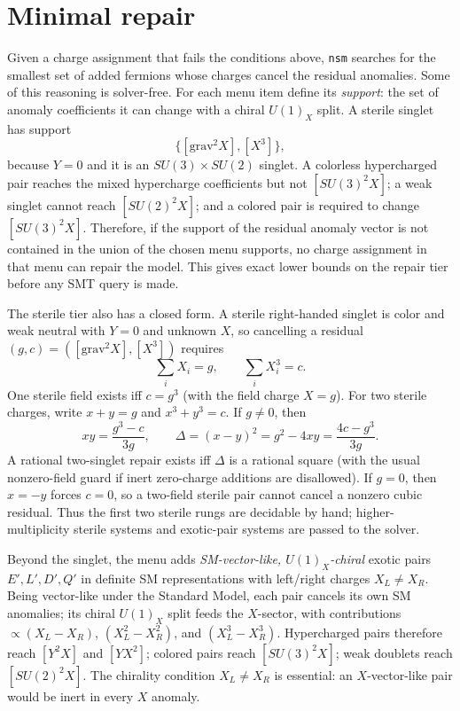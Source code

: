 \documentclass[11pt]{article}
\newcommand{\nsm}{\texttt{nsm}}
\newcommand{\UX}{U(1)_X}
\newcommand{\SUthree}{SU(3)}
\newcommand{\SUtwo}{SU(2)}
\begin{document}
\section{Minimal repair}

Given a charge assignment that fails the conditions above, \nsm{} searches for
the smallest set of added fermions whose charges cancel the residual anomalies.
Some of this reasoning is solver-free. For each menu item define its
\emph{support}: the set of anomaly coefficients it can change with a chiral
$\UX$ split. A sterile singlet has support
\[
\{[\text{grav}^2X], [X^3]\},
\]
because $Y=0$ and it is an $\SUthree\times\SUtwo$ singlet. A colorless
hypercharged pair reaches the mixed hypercharge coefficients but not
$[\SUthree^2X]$; a weak singlet cannot reach $[\SUtwo^2X]$; and a colored pair
is required to change $[\SUthree^2X]$. Therefore, if the support of the residual
anomaly vector is not contained in the union of the chosen menu supports, no
charge assignment in that menu can repair the model. This gives exact lower
bounds on the repair tier before any SMT query is made.

The sterile tier also has a closed form. A sterile right-handed singlet is color
and weak neutral with $Y=0$ and unknown $X$, so cancelling a residual
$(g,c)=([\text{grav}^2X],[X^3])$ requires
\begin{equation}
\sum_i X_i = g, \qquad \sum_i X_i^3 = c.
\label{eq:repair}
\end{equation}
One sterile field exists iff $c=g^3$ (with the field charge $X=g$). For two
sterile charges, write $x+y=g$ and $x^3+y^3=c$. If $g\ne0$, then
\[
xy=\frac{g^3-c}{3g}, \qquad
\Delta=(x-y)^2 = g^2-4xy = \frac{4c-g^3}{3g}.
\]
A rational two-singlet repair exists iff $\Delta$ is a rational square (with
the usual nonzero-field guard if inert zero-charge additions are disallowed).
If $g=0$, then $x=-y$ forces $c=0$, so a two-field sterile pair cannot cancel a
nonzero cubic residual. Thus the first two sterile rungs are decidable by hand;
higher-multiplicity sterile systems and exotic-pair systems are passed to the
solver.

Beyond the singlet, the menu adds \emph{SM-vector-like, $\UX$-chiral} exotic
pairs $E',L',D',Q'$ in definite SM representations with left/right charges
$X_L\neq X_R$. Being vector-like under the Standard Model, each pair cancels its
own SM anomalies; its chiral $\UX$ split feeds the $X$-sector, with contributions
$\propto(X_L-X_R)$, $(X_L^2-X_R^2)$, and $(X_L^3-X_R^3)$. Hypercharged pairs
therefore reach $[Y^2X]$ and $[YX^2]$; colored pairs reach $[\SUthree^2X]$; weak
doublets reach $[\SUtwo^2X]$. The chirality condition $X_L\neq X_R$ is
essential: an $X$-vector-like pair would be inert in every $X$ anomaly.
\end{document}
